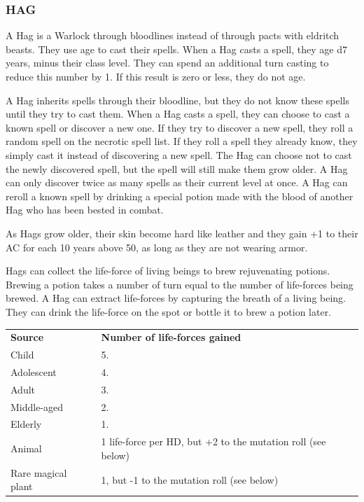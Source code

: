 \documentclass[twoside]{article}
\begin{document}
\subsubsection*{\footnotesize{H}\scriptsize{AG}\normalsize}

A Hag is a Warlock through bloodlines instead of through pacts with eldritch beasts. They use age to cast their spells. When a Hag casts a spell, they age d7 years, minus their class level. They can spend an additional turn casting to reduce this number by 1. If this result is zero or less, they do not age.

\bigbreak

A Hag inherits spells through their bloodline, but they do not know these spells until they try to cast them. When a Hag casts a spell, they can choose to cast a known spell or discover a new one. If they try to discover a new spell, they roll a random spell on the necrotic spell list. If they roll a spell they already know, they simply cast it instead of discovering a new spell. The Hag can choose not to cast the newly discovered spell, but the spell will still make them grow older. A Hag can only discover twice as many spells as their current level at once. A Hag can reroll a known spell by drinking a special potion made with the blood of another Hag who has been bested in combat.

\bigbreak

As Hags grow older, their skin become hard like leather and they gain +1 to their AC for each 10 years above 50, as long as they are not wearing armor.

\bigbreak

Hags can collect the life-force of living beings to brew rejuvenating potions. Brewing a potion takes a number of turn equal to the number of life-forces being brewed. A Hag can extract life-forces by capturing the breath of a living being. They can drink the life-force on the spot or bottle it to brew a potion later.

\bigbreak

\begin{center}
\noindent\begin{tabular}{p{}p{}}
\textbf{Source}&\textbf{Number of life-forces gained}\\
\rowcolor[gray]{0.75}Child&5.\\
Adolescent&4.\\
\rowcolor[gray]{0.75}Adult&3.\\
Middle-aged&2.\\
\rowcolor[gray]{0.75}Elderly&1.\\
Animal&1 life-force per HD, but +2 to the mutation roll (see below)\\
\rowcolor[gray]{0.75}Rare magical plant&1, but -1 to the mutation roll (see below)\\
\end{tabular}
\end{center}
\end{document}
